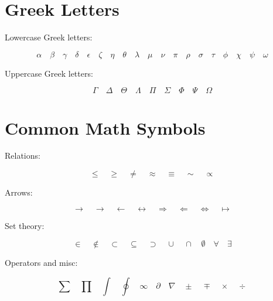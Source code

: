 \documentclass[12pt, a4paper]{article}
\begin{document}
\section*{Greek Letters}

Lowercase Greek letters:

\[
  \alpha \quad \beta \quad \gamma \quad \delta \quad \epsilon \quad
  \zeta \quad \eta \quad \theta \quad \lambda \quad \mu \quad \nu \quad
  \pi \quad \rho \quad \sigma \quad \tau \quad \phi \quad \chi \quad
  \psi \quad \omega
\]

Uppercase Greek letters:

\[
  \Gamma \quad \Delta \quad \Theta \quad \Lambda \quad \Pi \quad
  \Sigma \quad \Phi \quad \Psi \quad \Omega
\]

\section*{Common Math Symbols}

Relations:

\[
  \leq \quad \geq \quad \neq \quad \approx \quad \equiv \quad
  \sim \quad \propto
\]

Arrows:

\[
  \to \quad \rightarrow \quad \leftarrow \quad \leftrightarrow \quad
  \Rightarrow \quad \Leftarrow \quad \Leftrightarrow \quad \mapsto
\]

Set theory:

\[
  \in \quad \notin \quad \subset \quad \subseteq \quad \supset \quad
  \cup \quad \cap \quad \emptyset \quad \forall \quad \exists
\]

Operators and misc:

\[
  \sum \quad \prod \quad \int \quad \oint \quad \infty \quad
  \partial \quad \nabla \quad \pm \quad \mp \quad \times \quad \div
\]
\end{document}
